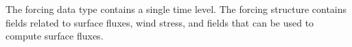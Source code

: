 The forcing data type contains a single time level. The forcing structure
contains fields related to surface fluxes, wind stress, and fields that can be
used to compute surface fluxes.
